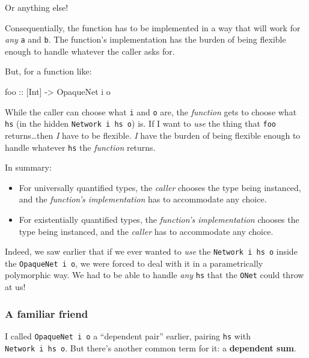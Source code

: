 \documentclass[]{article}
\newenvironment{Shaded}{}{}
\newcommand{\DataTypeTok}[1]{\textcolor[rgb]{0.56,0.13,0.00}{#1}}
\newcommand{\NormalTok}[1]{#1}
\newcommand{\OtherTok}[1]{\textcolor[rgb]{0.00,0.44,0.13}{#1}}
\begin{document}
Or anything else!

Consequentially, the function has to be implemented in a way that will work for
\emph{any} \texttt{a} and \texttt{b}. The function's implementation has the
burden of being flexible enough to handle whatever the caller asks for.

But, for a function like:

\begin{Shaded}
\begin{Highlighting}[]
\OtherTok{foo ::}\NormalTok{ [}\DataTypeTok{Int}\NormalTok{] }\OtherTok{{-}\textgreater{}} \DataTypeTok{OpaqueNet}\NormalTok{ i o}
\end{Highlighting}
\end{Shaded}

While the caller can choose what \texttt{i} and \texttt{o} are, the
\emph{function} gets to choose what \texttt{hs} (in the hidden
\texttt{Network\ i\ hs\ o}) is. If I want to \emph{use} the thing that
\texttt{foo} returns\ldots then \emph{I} have to be flexible. \emph{I} have the
burden of being flexible enough to handle whatever \texttt{hs} the
\emph{function} returns.

In summary:

\begin{itemize}
\item
  For universally quantified types, the \emph{caller} chooses the type being
  instanced, and the \emph{function's implementation} has to accommodate any
  choice.
\item
  For existentially quantified types, the \emph{function's implementation}
  chooses the type being instanced, and the \emph{caller} has to accommodate any
  choice.
\end{itemize}

Indeed, we saw earlier that if we ever wanted to \emph{use} the
\texttt{Network\ i\ hs\ o} inside the \texttt{OpaqueNet\ i\ o}, we were forced
to deal with it in a parametrically polymorphic way. We had to be able to handle
\emph{any} \texttt{hs} that the \texttt{ONet} could throw at us!

\subsubsection{A familiar friend}\label{a-familiar-friend}

I called \texttt{OpaqueNet\ i\ o} a ``dependent pair'' earlier, pairing
\texttt{hs} with \texttt{Network\ i\ hs\ o}. But there's another common term for
it: a \textbf{dependent sum}.
\end{document}
